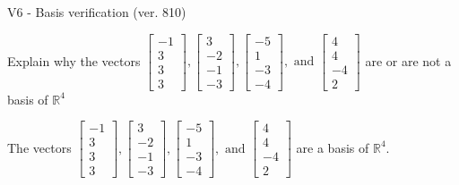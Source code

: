 \begin{exercise}
  \begin{exerciseTitle}V6 - Basis verification (ver. 810)\end{exerciseTitle}
  \begin{exerciseStatement}
    Explain why the vectors \(\left[\begin{array}{r}
-1 \\
3 \\
3 \\
3
\end{array}\right] , \left[\begin{array}{r}
3 \\
-2 \\
-1 \\
-3
\end{array}\right] , \left[\begin{array}{r}
-5 \\
1 \\
-3 \\
-4
\end{array}\right] , \text{ and } \left[\begin{array}{r}
4 \\
4 \\
-4 \\
2
\end{array}\right]\) are or are not a basis of \(\mathbb{R}^4\)	


  \end{exerciseStatement}
  \begin{exerciseAnswer}
   The vectors \(\left[\begin{array}{r}
-1 \\
3 \\
3 \\
3
\end{array}\right] , \left[\begin{array}{r}
3 \\
-2 \\
-1 \\
-3
\end{array}\right] , \left[\begin{array}{r}
-5 \\
1 \\
-3 \\
-4
\end{array}\right] , \text{ and } \left[\begin{array}{r}
4 \\
4 \\
-4 \\
2
\end{array}\right]\) 
  	 are  a basis of \(\mathbb{R}^4\).
  


  \end{exerciseAnswer}
\end{exercise}